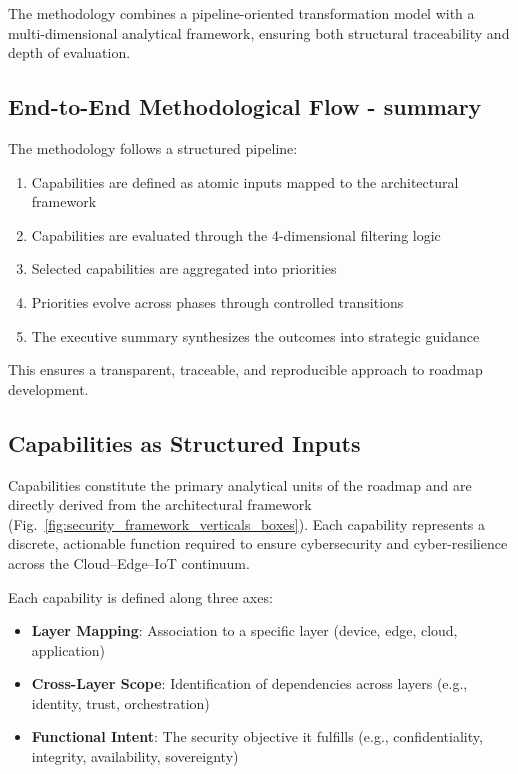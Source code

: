 \documentclass{ieeeaccess}
\begin{document}
The methodology combines a pipeline-oriented transformation model with a multi-dimensional analytical framework, ensuring both structural traceability and depth of evaluation.

\subsection{End-to-End Methodological Flow - summary}

The methodology follows a structured pipeline:

\begin{enumerate}
    \item Capabilities are defined as atomic inputs mapped to the architectural framework
    \item Capabilities are evaluated through the 4-dimensional filtering logic
    \item Selected capabilities are aggregated into priorities
    \item Priorities evolve across phases through controlled transitions
    \item The executive summary synthesizes the outcomes into strategic guidance
\end{enumerate}

This ensures a transparent, traceable, and reproducible approach to roadmap development.




\subsection{Capabilities as Structured Inputs}

Capabilities constitute the primary analytical units of the roadmap and are directly derived from the architectural framework (Fig.~\ref{fig:security_framework_verticals_boxes}). Each capability represents a discrete, actionable function required to ensure cybersecurity and cyber-resilience across the Cloud--Edge--IoT continuum.

Each capability is defined along three axes:

\begin{itemize}
    \item \textbf{Layer Mapping}: Association to a specific layer (device, edge, cloud, application)
    \item \textbf{Cross-Layer Scope}: Identification of dependencies across layers (e.g., identity, trust, orchestration)
    \item \textbf{Functional Intent}: The security objective it fulfills (e.g., confidentiality, integrity, availability, sovereignty)
\end{itemize}
\end{document}
